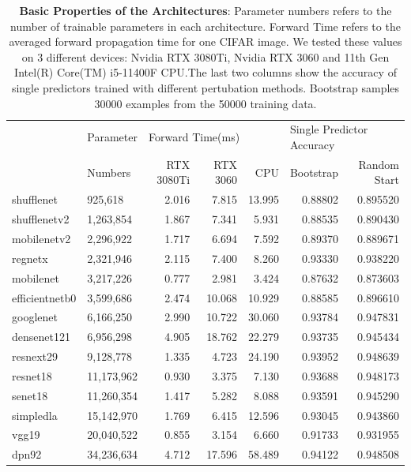 \documentclass{article}
\begin{document}
\begin{table}[H]
\caption{\textbf{Basic Properties of the Architectures}: Parameter numbers refers to the number of trainable parameters in each architecture. Forward Time refers to the averaged forward propagation time for one CIFAR image. We tested these values on 3 different devices: Nvidia RTX 3080Ti, Nvidia RTX 3060 and 11th Gen Intel(R) Core(TM) i5-11400F CPU.The last two columns show the accuracy of single predictors trained with different pertubation methods. Bootstrap samples 30000 examples from the 50000 training data.}
\centering
\begin{tabular}{llrrrrr}
    \toprule
    {} &  Parameter & \multicolumn{3}{l}{Forward Time(ms)} & \multicolumn{2}{l}{Single Predictor Accuracy} \\
    {} &      Numbers &  RTX 3080Ti & RTX 3060 &     CPU &  Bootstrap & Random Start \\
    \midrule
    shufflenet     &     925,618 &       2.016 &    7.815 &  13.995 &    0.88802 &     0.895520 \\
    shufflenetv2   &   1,263,854 &       1.867 &    7.341 &   5.931 &    0.88535 &     0.890430 \\
    mobilenetv2    &   2,296,922 &       1.717 &    6.694 &   7.592 &    0.89370 &     0.889671 \\
    regnetx        &   2,321,946 &       2.115 &    7.400 &   8.260 &    0.93330 &     0.938220 \\
    mobilenet      &   3,217,226 &       0.777 &    2.981 &   3.424 &    0.87632 &     0.873603 \\
    efficientnetb0 &   3,599,686 &       2.474 &   10.068 &  10.929 &    0.88585 &     0.896610 \\
    googlenet      &   6,166,250 &       2.990 &   10.722 &  30.060 &    0.93784 &     0.947831 \\
    densenet121    &   6,956,298 &       4.905 &   18.762 &  22.279 &    0.93735 &     0.945434 \\
    resnext29      &   9,128,778 &       1.335 &    4.723 &  24.190 &    0.93952 &     0.948639 \\
    resnet18       &  11,173,962 &       0.930 &    3.375 &   7.130 &    0.93688 &     0.948173 \\
    senet18        &  11,260,354 &       1.417 &    5.282 &   8.088 &    0.93591 &     0.945290 \\
    simpledla      &  15,142,970 &       1.769 &    6.415 &  12.596 &    0.93045 &     0.943860 \\
    vgg19          &  20,040,522 &       0.855 &    3.154 &   6.660 &    0.91733 &     0.931955 \\
    dpn92          &  34,236,634 &       4.712 &   17.596 &  58.489 &    0.94122 &     0.948508 \\
    \bottomrule
\end{tabular}
\label{table:arc_basic}
\end{table}
\end{document}
